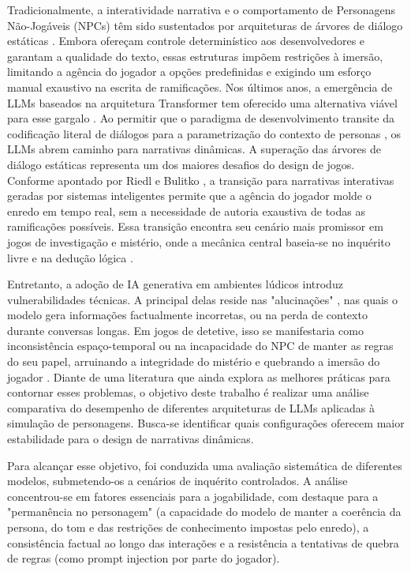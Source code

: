\documentclass[12pt]{article}
\begin{document}
Tradicionalmente, a interatividade narrativa e o comportamento de Personagens Não-Jogáveis (NPCs) têm sido sustentados por arquiteturas de árvores de diálogo estáticas \cite{ref1}. Embora ofereçam controle determinístico aos desenvolvedores e garantam a qualidade do texto, essas estruturas impõem restrições à imersão, limitando a agência do jogador a opções predefinidas e exigindo um esforço manual exaustivo na escrita de ramificações. Nos últimos anos, a emergência de LLMs baseados na arquitetura Transformer tem oferecido uma alternativa viável para esse gargalo \cite{ref4}. Ao permitir que o paradigma de desenvolvimento transite da codificação literal de diálogos para a parametrização do contexto de personas \cite{ref2}, os LLMs abrem caminho para narrativas dinâmicas. A superação das árvores de diálogo estáticas representa um dos maiores desafios do design de jogos. Conforme apontado por Riedl e Bulitko \cite{riedl2013}, a transição para narrativas interativas geradas por sistemas inteligentes permite que a agência do jogador molde o enredo em tempo real, sem a necessidade de autoria exaustiva de todas as ramificações possíveis. Essa transição encontra seu cenário mais promissor em jogos de investigação e mistério, onde a mecânica central baseia-se no inquérito livre e na dedução lógica \cite{ref7}.

Entretanto, a adoção de IA generativa em ambientes lúdicos introduz vulnerabilidades técnicas. A principal delas reside nas "alucinações" \cite{ref10}, nas quais o modelo gera informações factualmente incorretas, ou na perda de contexto durante conversas longas. Em jogos de detetive, isso se manifestaria como inconsistência espaço-temporal ou na incapacidade do NPC de manter as regras do seu papel, arruinando a integridade do mistério e quebrando a imersão do jogador \cite{ref13}. Diante de uma literatura que ainda explora as melhores práticas para contornar esses problemas, o objetivo deste trabalho é realizar uma análise comparativa do desempenho de diferentes arquiteturas de LLMs aplicadas à simulação de personagens. Busca-se identificar quais configurações oferecem maior estabilidade para o design de narrativas dinâmicas.

Para alcançar esse objetivo, foi conduzida uma avaliação sistemática de diferentes modelos, submetendo-os a cenários de inquérito controlados. A análise concentrou-se em fatores essenciais para a jogabilidade, com destaque para a "permanência no personagem" (a capacidade do modelo de manter a coerência da persona, do tom e das restrições de conhecimento impostas pelo enredo), a consistência factual ao longo das interações e a resistência a tentativas de quebra de regras (como prompt injection por parte do jogador).
\end{document}
